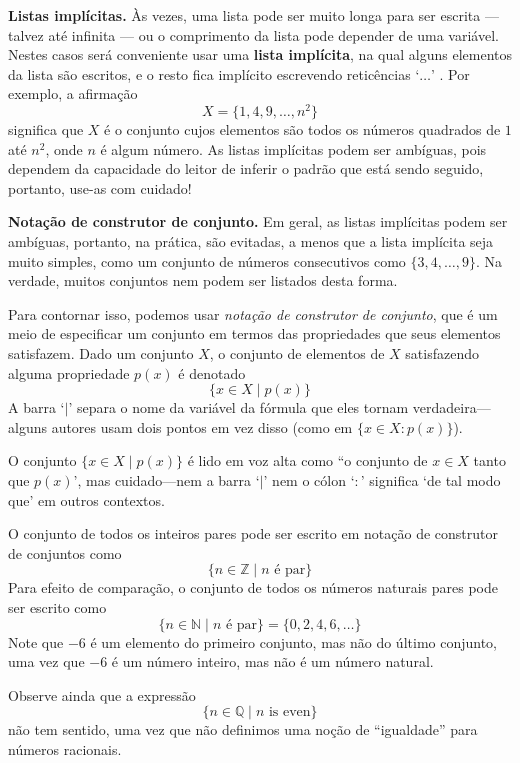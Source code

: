 \textbf{Listas implícitas.}
Às vezes, uma lista pode ser muito longa para ser escrita — talvez até infinita — ou o comprimento da lista pode depender de uma variável. Nestes casos será conveniente usar uma \textbf{lista implícita}, na qual alguns elementos da lista são escritos, e o resto fica implícito escrevendo reticências `$\dots$' . Por exemplo, a afirmação
\[ X = \{ 1, 4, 9, \dots, n^2 \} \]
significa que $X$ é o conjunto cujos elementos são todos os números quadrados de $1$ até $n^2$, onde $n$ é algum número. As listas implícitas podem ser ambíguas, pois dependem da capacidade do leitor de inferir o padrão que está sendo seguido, portanto, use-as com cuidado!

\textbf{Notação de construtor de conjunto.}
Em geral, as listas implícitas podem ser ambíguas, portanto, na prática, são evitadas, a menos que a lista implícita seja muito simples, como um conjunto de números consecutivos como $\{3, 4, \dots, 9 \}$. Na verdade, muitos conjuntos nem podem ser listados desta forma.

Para contornar isso, podemos usar \textit{notação de construtor de conjunto}, que é um meio de especificar um conjunto em termos das propriedades que seus elementos satisfazem. Dado um conjunto $X$, o conjunto de elementos de $X$ satisfazendo alguma propriedade $p(x)$ é denotado
\[ \{ x \in X \mid p(x) \} \]
A barra `$\mid$'  separa o nome da variável da fórmula que eles tornam verdadeira---alguns autores usam dois pontos em vez disso (como em $\{ x \in X : p(x) \}$).

O conjunto $\{ x \in X \mid p(x) \}$ é lido em voz alta como “o conjunto de $x \in X$ tanto que $p(x)$', mas cuidado---nem a barra `$\mid$' nem o cólon `$:$' significa `de tal modo que' em outros contextos.

\begin{example}
\label{exSetsSpecifyUniverses}
O conjunto de todos os inteiros pares pode ser escrito em notação de construtor de conjuntos como
\[ \{ n \in \mathbb{Z} \mid n \text{ é par} \} \]
Para efeito de comparação, o conjunto de todos os números naturais pares pode ser escrito como
\[ \{ n \in \mathbb{N} \mid n \text{ é par} \} = \{ 0, 2, 4, 6, \dots \} \]
Note que $-6$ é um elemento do primeiro conjunto, mas não do último conjunto, uma vez que $-6$ é um número inteiro, mas não é um número natural.

Observe ainda que a expressão
\[ \{ n \in \mathbb{Q} \mid n \text{ is even} \} \]
não tem sentido, uma vez que não definimos uma noção de “igualdade” para números racionais.
\end{example}

